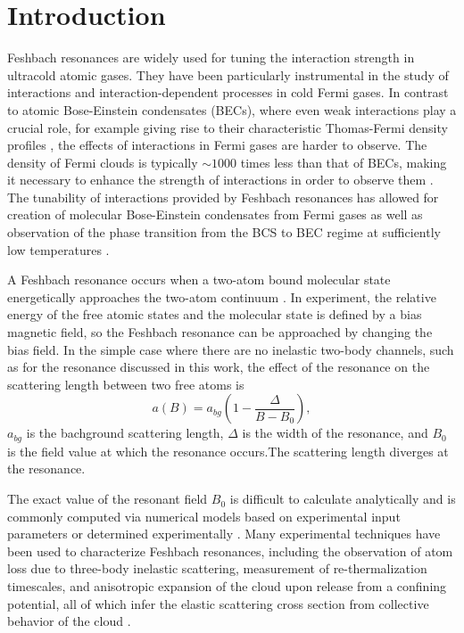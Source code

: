 \documentclass[12pt]{iopart}
\begin{document}
\section{Introduction}
Feshbach resonances are widely used for tuning the interaction strength in ultracold atomic gases. They have been particularly instrumental in the study of interactions and interaction-dependent processes in cold Fermi gases. In contrast to atomic Bose-Einstein condensates (BECs), where even weak interactions play a crucial role, for example giving rise to their characteristic Thomas-Fermi density profiles \cite{KetterleBEC}, the effects of interactions in Fermi gases are harder to observe. The density of Fermi clouds is typically $\sim1000$ times less than that of BECs, making it necessary to enhance the strength of interactions in order to observe them \cite{KetterleDFG}. The tunability of interactions provided by Feshbach resonances has allowed for creation of molecular Bose-Einstein condensates from Fermi gases \cite{Greiner03,Zwierlein03, Jochim03} as well as observation of the phase transition from the BCS to BEC regime at sufficiently low temperatures \cite{Bartenstein04, Bourdel04, Zwierlein04, Regal04}. 
\par A Feshbach resonance occurs when a two-atom bound molecular state energetically approaches the two-atom continuum \cite{Chin10, Timmermans99}. In experiment, the relative energy of the free atomic states and the molecular state is defined by a bias magnetic field, so the Feshbach resonance can be approached by changing the bias field. In the simple case where there are no inelastic two-body channels, such as for the \K{} resonance discussed in this work, the effect of the resonance on the scattering length between two free atoms is \cite{Chin10}
\begin{equation}
a(B)=a_{bg}\left(1-\frac{\Delta}{B-B_0}\right),
\label{feshbachEq}
\end{equation}
 $a_{bg}$ is the bachground scattering length, $\Delta$ is the width of the resonance, and $B_0$ is the field value at which the resonance occurs.The scattering length diverges at the resonance.
\par  The exact value of the resonant field $B_0$ is difficult to calculate analytically and is commonly computed via numerical models based on experimental input parameters \cite{Tiesinga93, Lysebo09, Gao11} or determined experimentally \cite{Inouye98, Cornish00}. Many experimental techniques have been used to characterize Feshbach resonances, including the observation of atom loss due to three-body inelastic scattering, measurement of re-thermalization timescales, and anisotropic expansion of the cloud upon release from a confining potential, all of which infer the elastic scattering cross section from collective behavior of the cloud \cite{Regal03,OHara02,Monroe93}. 
\end{document}

